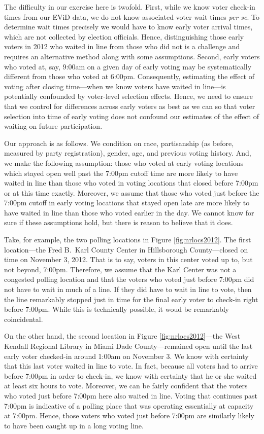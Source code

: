\documentclass[12pt,titlepage]{article}
\begin{document}
The difficulty in our exercise here is twofold.  First, while we know
voter check-in times from our EViD data, we do not know associated
voter wait times \emph{per se}.  To determine wait times precisely we
would have to know early voter arrival times, which are not collected
by election officials.  Hence, distinguishing those early voters in
2012 who waited in line from those who did not is a challenge and
requires an alternative method along with some assumptions.  Second,
early voters who voted at, say, 9:00am on a given day of early voting
may be systematically different from those who voted at
6:00pm. Consequently, estimating the effect of voting after closing
time---when we know voters have waited in line---is potentially
confounded by voter-level selection effects.  Hence, we need to ensure
that we control for differences across early voters as best as we can
so that voter selection into time of early voting does not confound
our estimates of the effect of waiting on future participation.

Our approach is as follows.  We condition on race, partisanship (as
before, measured by party registration), gender, age, and previous
voting history.  And, we make the following assumption: those who
voted at early voting locations which stayed open well past the 7:00pm
cutoff time are more likely to have waited in line than those who
voted in voting locations that closed before 7:00pm or at this time
exactly.  Moreover, we assume that those who voted just before the
7:00pm cutoff in early voting locations that stayed open late are more
likely to have waited in line than those who voted earlier in the day.
We cannot know for sure if these assumptions hold, but there is reason
to believe that it does.

Take, for example, the two polling locations in Figure
\ref{fig:nrlocs2012}.  The first location---the Fred B.\ Karl County
Center in Hillsborough County---closed on time on November 3,
2012. That is to say, voters in this center voted up to, but not
beyond, 7:00pm.  Therefore, we assume that the Karl Center was not a
congested polling location and that the voters who voted just before
7:00pm did not have to wait in much of a line.  If they did have to
wait in line to vote, then the line remarkably stopped just in time
for the final early voter to check-in right before 7:00pm.  While this
is technically possible, it woud be remarkably coincidental.

On the other hand, the second location in Figure
\ref{fig:nrlocs2012}---the West Kendall Regional Library in Miami Dade
County---remained open until the last early voter checked-in around
1:00am on November 3.  We know with certainty that this last voter
waited in line to vote.  In fact, because all voters had to arrive
before 7:00pm in order to check-in, we know with certainty that he or
she waited at least six hours to vote.  Moreover, we can be fairly
confident that the voters who voted just before 7:00pm here also
waited in line.  Voting that continues past 7:00pm is indicative of a
polling place that was operating essentially at capacity at 7:00pm.
Hence, those voters who voted just before 7:00pm are similarly likely
to have been caught up in a long voting line.
\end{document}
